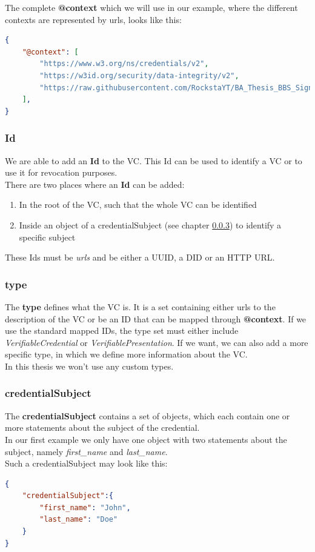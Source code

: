 \documentclass[
	a4paper               %
	,bibliography=totoc   %
	,listof=totoc         %
	,monolingual
	twoside=false,
]{bfhthesis}              %
\begin{document}
The complete \textbf{@context} which we will use in our example, where the different contexts are represented by urls, looks like this:
\begin{lstlisting}[language=json,firstnumber=1,caption={Example context},captionpos=b]
{
	"@context": [
		"https://www.w3.org/ns/credentials/v2",
		"https://w3id.org/security/data-integrity/v2",
		"https://raw.githubusercontent.com/RockstaYT/BA_Thesis_BBS_Signatures/docs/context/example_1.jsonld"
	],
}
\end{lstlisting}

\subsubsection{Id}
We are able to add an \textbf{Id} to the VC. This Id can be used to identify a VC or to use it for revocation purposes.\\
There are two places where an \textbf{Id} can be added:
\begin{enumerate}
	\item In the root of the VC, such that the whole VC can be identified
	\item Inside an object of a credentialSubject (see chapter \ref{subsub:credentialsubject}) to identify a specific subject
\end{enumerate}

These Ids must be \textit{urls} and be either a UUID, a DID or an HTTP URL.

\subsubsection{type}

The \textbf{type} defines what the VC is. 
It is a set containing either urls to the description of the VC or be an ID that can be mapped through \textbf{@context}.
If we use the standard mapped IDs, the type set must either include \textit{VerifiableCredential} or \textit{VerifiablePresentation}.
If we want, we can also add a more specific type, in which we define more information about the VC.\\
In this thesis we won't use any custom types.

\subsubsection{credentialSubject}
\label{subsub:credentialsubject}
The \textbf{credentialSubject} contains a set of objects, which each contain one or more statements about the subject of the credential.\\
In our first example we only have one object with two statements about the subject, namely \textit{first\_name} and \textit{last\_name}.\\
Such a credentialSubject may look like this:
\begin{lstlisting}[language=json,firstnumber=1,caption={Example credentialSubject},captionpos=b]
{
	"credentialSubject":{
		"first_name": "John",
		"last_name": "Doe"
	}
}
\end{lstlisting}
\end{document}
